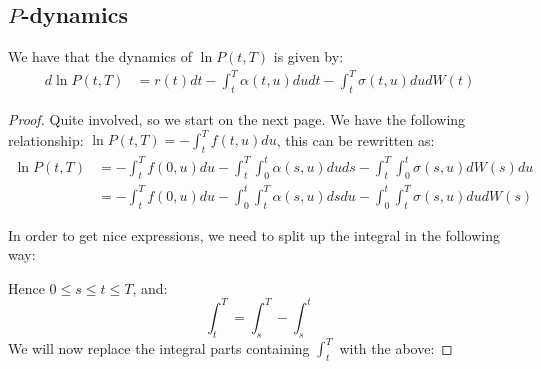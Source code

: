 \subsection{$P$-dynamics}

\begin{proposition}
We have that the dynamics of $\ln P(t,T)$ is given by: 
\begin{align*}
d\ln P(t,T) &= 
r(t)dt - \int_{t}^{T}\alpha(t,u)dudt - \int_{t}^{T}\sigma(t,u)dudW(t)    
\end{align*}
\end{proposition}

\begin{proof}

Quite involved, so we start on the next page. 
\newpage 
We have the following relationship: $\ln P(t,T) = -\int_{t}^{T}f(t,u)du$, this can be rewritten as:
\begin{align*}
\ln P(t,T) &= 
-\int_{t}^{T}f(0,u)du - \int_{t}^{T}\int_{0}^{t}\alpha(s,u)duds 
-\int_{t}^{T}\int_{0}^{t}\sigma(s,u)dW(s)du \\ 
&= 
-\int_{t}^{T}f(0,u)du - \int_{0}^{t}\int_{t}^{T}\alpha(s,u)dsdu 
-\int_{0}^{t}\int_{t}^{T}\sigma(s,u)dudW(s) 
\end{align*}

In order to get nice expressions, we need to split up the integral in the following way:



Hence $0 \leq s \leq t \leq T$, and: 
$$
\int_{t}^{T} = \int_{s}^{T}-\int_{s}^{t}
$$
We will now replace the integral parts containing $\int_{t}^{T}$ with the above: 


\end{proof}
